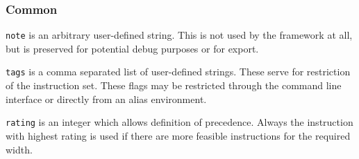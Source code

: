 \subsubsection{Common}
\begin{description}
  \item\texttt{note} is an arbitrary user-defined string. This is not used by the framework at all, but is preserved for potential debug purposes or for export.
  \item\texttt{tags} is a comma separated list of user-defined strings. These serve for restriction of the instruction set. These flags may be restricted through the command line interface or directly from an alias environment.
  \item\texttt{rating} is an integer which allows definition of precedence. Always the instruction with highest rating is used if there are more feasible instructions for the required width.
\end{description}

